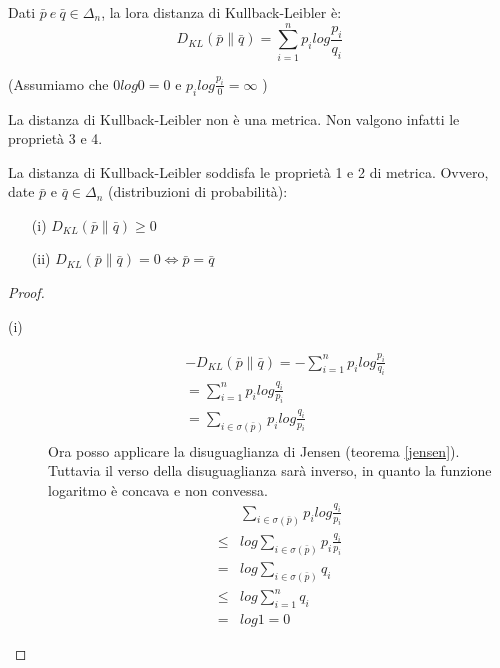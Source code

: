 \begin{definizione}
\mbox{}

 Dati $\bar{p} \ e \ \bar{q} \in \Delta_n$, la lora distanza di Kullback-Leibler è:
\[
 D_{KL}(\bar{p} \| \bar{q})=\sum_{i=1}^n p_i log\frac{p_i}{q_i}
\]

(Assumiamo che $0 log0=0$ e $p_i log \frac{p_i}{0}=\infty$ )
\label{distkl}
\end{definizione}

\begin{osservazione}
 La distanza di Kullback-Leibler non è una metrica. Non valgono infatti le proprietà 3 e 4.
\end{osservazione}

\begin{teorema}
 La distanza di Kullback-Leibler soddisfa le proprietà 1 e 2 di metrica.
 Ovvero, date $\bar{p}$ e $\bar{q} \in \Delta_n$ (distribuzioni di probabilità):

 \begin{itemize}
  \item[(i)]  $D_{KL}(\bar{p} \| \bar{q}) \ge 0$
  \item[(ii)] $D_{KL}(\bar{p} \| \bar{q}) = 0 \iff \bar{p}=\bar{q}$
 \end{itemize}

\begin{proof}
 \mbox{}

 \begin{description}
 \item[(i)]
  \[\begin{split}
    &-D_{KL}(\bar{p} \| \bar{q})= -\sum_{i=1}^n p_i log \frac{p_i}{q_i} \\
    &=\sum_{i=1}^n p_i log \frac{q_i}{p_i} \\
    &=\sum_{i \in \sigma(\bar{p})} p_i log \frac{q_i}{p_i} \\
    \end{split}
  \]
  Ora posso applicare la disuguaglianza di Jensen (teorema \ref{jensen}). Tuttavia 
  il verso della disuguaglianza sarà inverso, in quanto la funzione logaritmo è concava e non convessa.
 \[\begin{split}
  &\sum_{i \in \sigma(\bar{p})} p_i log \frac{q_i}{p_i} \\
   \le & log \sum_{i \in \sigma(\bar{p})} p_i \frac{q_i}{p_i} \\
  =& log \sum_{i \in \sigma(\bar{p})} q_i \\
  \le & log \sum_{i=1}^n q_i \\
  =& log 1=0
  \end{split}
 \]


\end{description}
\end{proof}
\end{teorema}
